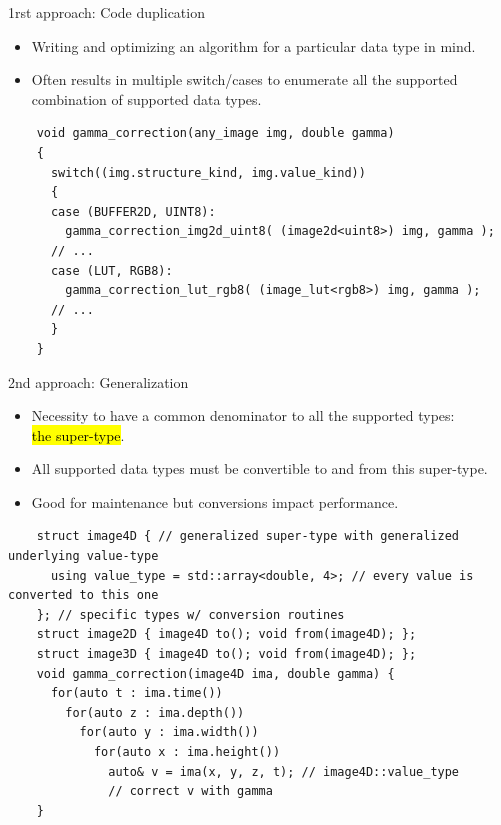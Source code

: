 \documentclass[12pt,aspectratio=169]{beamer}
\makeatletter
\let\HL\hl
\renewcommand\hl{%
  \let\set@color\beamerorig@set@color
  \let\reset@color\beamerorig@reset@color
  \HL}
\makeatother
\begin{document}
\begin{frame}[fragile]{1rst approach: Code duplication}
  \begin{itemize}
    \item Writing and optimizing an algorithm for a particular data type in mind.
    \item Often results in multiple switch/cases to enumerate all the supported combination of supported data types.
  \end{itemize}
  \begin{verbatim}
    void gamma_correction(any_image img, double gamma)
    {
      switch((img.structure_kind, img.value_kind)) 
      {
      case (BUFFER2D, UINT8):
        gamma_correction_img2d_uint8( (image2d<uint8>) img, gamma );
      // ...
      case (LUT, RGB8):
        gamma_correction_lut_rgb8( (image_lut<rgb8>) img, gamma );
      // ...
      }
    }
  \end{verbatim}
\end{frame}

\begin{frame}[fragile]{2nd approach: Generalization}
  \begin{itemize}
    \item Necessity to have a common denominator to all the supported types:\\
          \hl{the super-type}.
    \item All supported data types must be convertible to and from this super-type.
    \item Good for maintenance but conversions impact performance.
  \end{itemize}
  \begin{verbatim}
    struct image4D { // generalized super-type with generalized underlying value-type
      using value_type = std::array<double, 4>; // every value is converted to this one
    }; // specific types w/ conversion routines
    struct image2D { image4D to(); void from(image4D); };
    struct image3D { image4D to(); void from(image4D); };
    void gamma_correction(image4D ima, double gamma) {
      for(auto t : ima.time())
        for(auto z : ima.depth())
          for(auto y : ima.width())
            for(auto x : ima.height())
              auto& v = ima(x, y, z, t); // image4D::value_type
              // correct v with gamma
    }
  \end{verbatim}
\end{frame}
\end{document}
